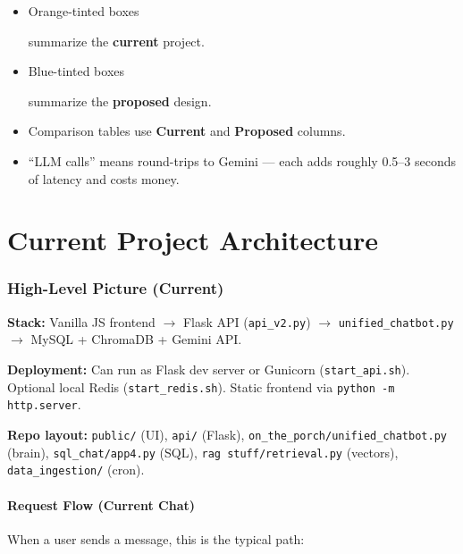 \documentclass[11pt,a4paper]{article}
\newcommand{\current}[1]{\colorbox{currentbg}{\parbox{\dimexpr\linewidth-2\fboxsep}{#1}}}
\newcommand{\proposed}[1]{\colorbox{proposedbg}{\parbox{\dimexpr\linewidth-2\fboxsep}{#1}}}
\begin{document}
\begin{itemize}[noitemsep]
  \item \current{Orange-tinted boxes} summarize the \textbf{current} project.
  \item \proposed{Blue-tinted boxes} summarize the \textbf{proposed} design.
  \item Comparison tables use \textbf{Current} and \textbf{Proposed} columns.
  \item ``LLM calls'' means round-trips to Gemini --- each adds roughly 0.5--3 seconds of latency and costs money.
\end{itemize}

\part{Current Project Architecture}

\section{High-Level Picture (Current)}

\current{
\textbf{Stack:} Vanilla JS frontend $\rightarrow$ Flask API (\texttt{api\_v2.py}) $\rightarrow$ \texttt{unified\_chatbot.py} $\rightarrow$ MySQL + ChromaDB + Gemini API.

\textbf{Deployment:} Can run as Flask dev server or Gunicorn (\texttt{start\_api.sh}). Optional local Redis (\texttt{start\_redis.sh}). Static frontend via \texttt{python -m http.server}.

\textbf{Repo layout:} \texttt{public/} (UI), \texttt{api/} (Flask), \texttt{on\_the\_porch/unified\_chatbot.py} (brain), \texttt{sql\_chat/app4.py} (SQL), \texttt{rag stuff/retrieval.py} (vectors), \texttt{data\_ingestion/} (cron).
}

\subsection{Request Flow (Current Chat)}

When a user sends a message, this is the typical path:
\end{document}
